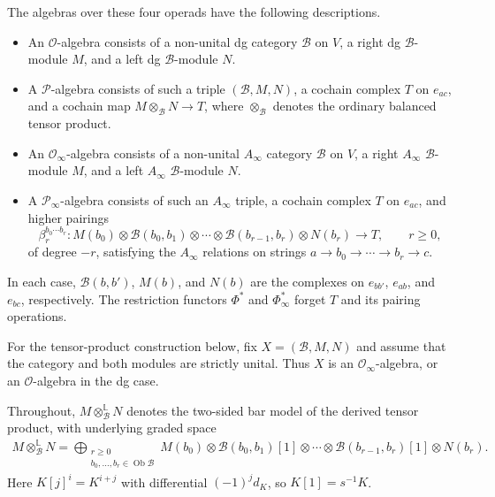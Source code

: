 \documentclass[11pt,letterpaper]{article}
\numberwithin{equation}{section}
\theoremstyle{plain}
\theoremstyle{definition}
\theoremstyle{remark}
\DeclareMathOperator{\Ob}{Ob}
\begin{document}
The algebras over these four operads have the following descriptions.
\begin{itemize}
\item An $\mathscr O$-algebra consists of a non-unital dg category
$\mathcal B$ on $V$, a right dg $\mathcal B$-module $M$, and a left
dg $\mathcal B$-module $N$.
\item A $\mathscr P$-algebra consists of such a triple
$(\mathcal B,M,N)$, a cochain complex $T$ on $e_{ac}$, and a cochain
map $M\otimes_{\mathcal B}N\to T$, where
$\otimes_{\mathcal B}$ denotes the ordinary balanced tensor product.
\item An $\mathscr O_\infty$-algebra consists of a non-unital
$A_\infty$ category $\mathcal B$ on $V$, a right $A_\infty$
$\mathcal B$-module $M$, and a left $A_\infty$ $\mathcal B$-module $N$.
\item A $\mathscr P_\infty$-algebra consists of such an
$A_\infty$ triple, a cochain complex $T$ on $e_{ac}$, and higher
pairings
\[
 \beta_r^{b_0\cdots b_r}:
 M(b_0)\otimes\mathcal B(b_0,b_1)\otimes\cdots
 \otimes\mathcal B(b_{r-1},b_r)\otimes N(b_r)
 \longrightarrow T,\qquad r\geq0,
\]
of degree $-r$, satisfying the $A_\infty$ relations on strings
$a\to b_0\to\cdots\to b_r\to c$.
\end{itemize}
In each case, $\mathcal B(b,b')$, $M(b)$, and $N(b)$ are the
complexes on $e_{bb'}$, $e_{ab}$, and $e_{bc}$, respectively.
The restriction functors $\Phi^*$ and $\Phi_\infty^*$ forget $T$
and its pairing operations.

For the tensor-product construction below, fix
$X=(\mathcal B,M,N)$ and assume that the category and both modules
are strictly unital. Thus $X$ is an $\mathscr O_\infty$-algebra,
or an $\mathscr O$-algebra in the dg case.

Throughout, $M\otimes_{\mathcal B}^{\mathbb L}N$ denotes the
two-sided bar model of the derived tensor product,
with underlying graded space
\begin{equation}\label{eq_tensor_bar_model}
\begin{aligned}
 M\otimes_{\mathcal B}^{\mathbb L}N
 =\bigoplus_{\substack{r\ge0\\b_0,\ldots,b_r\in\Ob\mathcal B}}
M(b_0)\otimes\mathcal B(b_0,b_1)[1]\otimes\cdots \otimes\mathcal B(b_{r-1},b_r)[1]\otimes N(b_r).
\end{aligned}
\end{equation}
Here $K[j]^i=K^{i+j}$ with differential $(-1)^j d_K$, so
$K[1]=s^{-1}K$.
\end{document}
